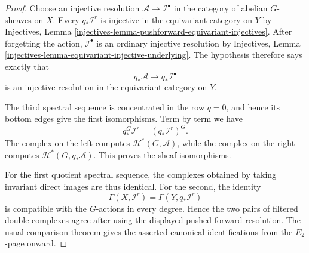 \begin{proof}
Choose an injective resolution
$\mathcal{A}\to\mathcal{I}^\bullet$ in the category of abelian $G$-sheaves
on $X$. Every $q_*\mathcal{I}^r$ is injective in the equivariant category on
$Y$ by Injectives, Lemma
\ref{injectives-lemma-pushforward-equivariant-injectives}. After forgetting
the action, $\mathcal{I}^\bullet$ is an ordinary injective resolution by
Injectives, Lemma \ref{injectives-lemma-equivariant-injective-underlying}.
The hypothesis therefore says exactly that
$$
q_*\mathcal{A}\longrightarrow q_*\mathcal{I}^\bullet
$$
is an injective resolution in the equivariant category on $Y$.

The third spectral sequence is concentrated in the row $q=0$, and hence its
bottom edges give the first isomorphisms. Term by term we have
$$
q_*^G\mathcal{I}^r=(q_*\mathcal{I}^r)^G.
$$
The complex on the left computes
$\mathcal{H}^*(G,\mathcal{A})$, while the complex on the right computes
$\mathcal{H}^*(G,q_*\mathcal{A})$. This proves the sheaf isomorphisms.

For the first quotient spectral sequence, the complexes obtained by taking
invariant direct images are thus identical. For the second, the identity
$$
\Gamma(X,\mathcal{I}^r)=\Gamma(Y,q_*\mathcal{I}^r)
$$
is compatible with the $G$-actions in every degree. Hence the two pairs of
filtered double complexes agree after using the displayed pushed-forward
resolution. The usual comparison theorem gives the asserted canonical
identifications from the $E_2$-page onward.
\end{proof}

